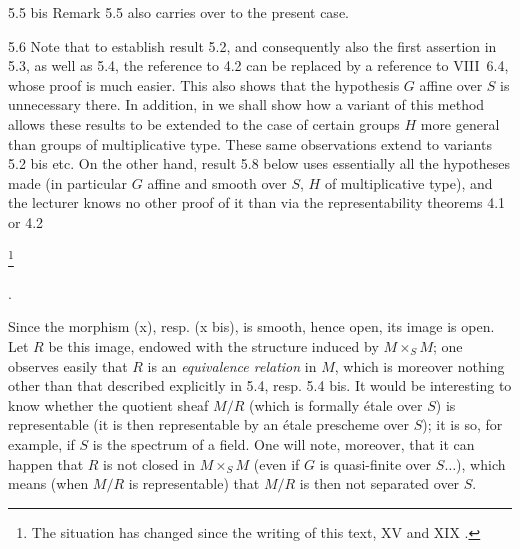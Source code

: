 \begin{remark}{5.5 bis}\label{XI.5.5bis}
Remark 5.5 also carries over to the present case.
\end{remark}
\begin{remark}{5.6}\label{XI.5.6}
Note that to establish result 5.2, and consequently also the first assertion in 5.3, as well as 5.4, the reference to 4.2 can be replaced by a reference to VIII~6.4, whose proof is much easier. This also shows that the hypothesis $G$ affine over $S$ is unnecessary there. In addition, in  we shall show how a variant of this method allows these results to be extended to the case of certain groups $H$ more general than groups of multiplicative type. These same observations extend to variants 5.2 bis etc. On the other hand, result 5.8 below uses essentially all the hypotheses made (in particular $G$ affine and smooth over $S$, $H$ of multiplicative type), and the lecturer knows no other proof of it than via the representability theorems 4.1 or 4.2{\renewcommand{\thefootnote}{*}\footnote{The situation has changed since the writing of this text, \cf XV and XIX .}\addtocounter{footnote}{-1}}.
\end{remark}

Since the morphism (x), resp. (x bis), is smooth, hence open, its image is open. Let $R$ be this image, endowed with the structure induced by $M\times_S M$; one observes easily that $R$ is an \emph{equivalence relation} in $M$, which is moreover nothing other than that described explicitly in 5.4, resp. 5.4 bis. It would be interesting to know whether the quotient sheaf $M/R$ (which is formally étale over $S$) is representable (it is then representable by an étale prescheme over $S$); it is so, for example, if $S$ is the spectrum of a field. One will note, moreover, that it can happen that $R$ is not closed in $M\times_S M$ (even if $G$ is quasi-finite over $S\ldots$), which means (when $M/R$ is representable) that $M/R$ is then not separated over $S$.


